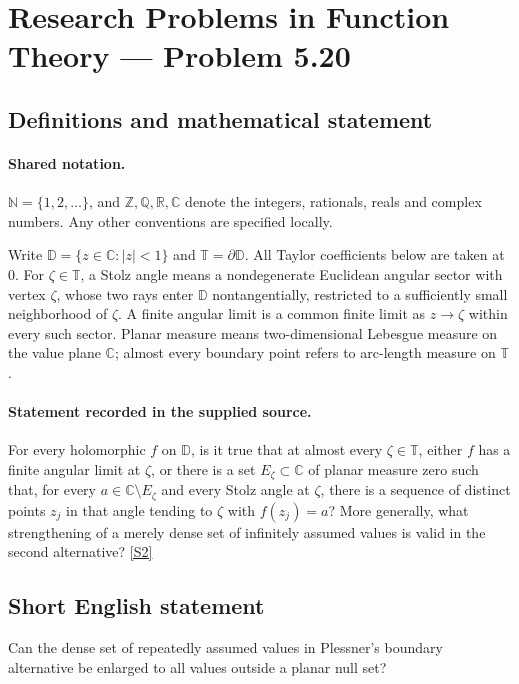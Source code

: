 \documentclass[11pt]{article}
\newcommand{\sref}[2]{\hyperlink{source:#1:#2}{[S#2]}}
\begin{document}
\section{Research Problems in Function Theory — Problem 5.20}\label{statement}

\subsection{Definitions and mathematical statement}

\paragraph{Shared notation.}$\mathbb N=\{1,2,\ldots\}$, and $\mathbb Z,\mathbb Q,\mathbb R,\mathbb C$ denote the integers, rationals, reals and complex numbers. Any other conventions are specified locally.


Write $\mathbb D=\{z\in\mathbb C:|z|<1\}$ and $\mathbb T=\partial\mathbb D$. All Taylor coefficients below are taken at $0$. For $\zeta\in\mathbb T$, a Stolz angle means a nondegenerate Euclidean angular sector with vertex $\zeta$, whose two rays enter $\mathbb D$ nontangentially, restricted to a sufficiently small neighborhood of $\zeta$. A finite angular limit is a common finite limit as $z\to\zeta$ within every such sector. Planar measure means two-dimensional Lebesgue measure on the value plane $\mathbb C$; almost every boundary point refers to arc-length measure on $\mathbb T$.
\paragraph{Statement recorded in the supplied source.}
For every holomorphic $f$ on $\mathbb D$, is it true that at almost every $\zeta\in\mathbb T$, either $f$ has a finite angular limit at $\zeta$, or there is a set $E_\zeta\subset\mathbb C$ of planar measure zero such that, for every $a\in\mathbb C\setminus E_\zeta$ and every Stolz angle at $\zeta$, there is a sequence of distinct points $z_j$ in that angle tending to $\zeta$ with $f(z_j)=a$? More generally, what strengthening of a merely dense set of infinitely assumed values is valid in the second alternative? \sref{statement}{2}
\subsection{Short English statement}
Can the dense set of repeatedly assumed values in Plessner’s boundary alternative be enlarged to all values outside a planar null set?
\end{document}
